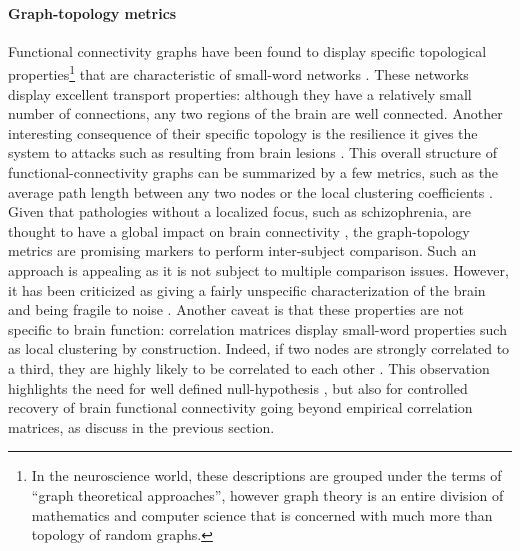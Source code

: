 \documentclass[5p]{elsarticle}
\begin{document}
\paragraph{Graph-topology metrics}
%
Functional connectivity graphs have been found to display specific
topological properties\footnote{In the neuroscience world, these
descriptions are grouped under the terms of ``graph theoretical
approaches'', however graph theory is an entire division of mathematics
and computer science that is concerned with much more than topology of
random graphs.} that are characteristic of small-word networks
\cite{stam2004,salvador2005,achard2006,bullmore2009}. These networks
display excellent transport properties: although they have a relatively
small number of connections, any two regions of the brain are well
connected. 
Another interesting consequence of their specific topology is
the resilience it gives the system to attacks such as resulting from
brain lesions \cite{achard2006}. This overall structure of
functional-connectivity graphs can be summarized by a few metrics, such
as the average path length between any two nodes or the local clustering
coefficients \cite{rubinov2010}. Given that pathologies without a
localized focus, such
as schizophrenia, are thought to have a global impact on brain
connectivity \cite{liu2008,bassett2008}, the graph-topology metrics are
promising markers to perform inter-subject comparison. Such an
approach is appealing as it is not subject to multiple comparison issues.
However, it has been criticized as giving a fairly unspecific
characterization of the brain and being fragile to noise
\cite{ioannides2007}. Another caveat is that these properties are not
specific to brain function: correlation matrices display
small-word properties such as local clustering by construction. Indeed, if two
nodes are strongly correlated to a third, they are highly likely to be
correlated to each other \cite{zalesky2012}. This observation highlights
the need for well defined null-hypothesis \cite{zalesky2012,rubinov2011},
but also for controlled recovery of brain functional connectivity going
beyond empirical correlation matrices, as discuss in the previous section.

\end{document}
